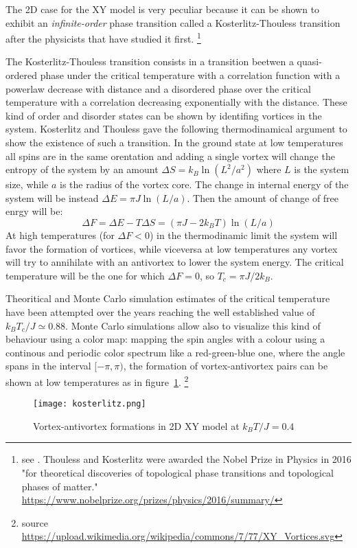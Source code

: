 The 2D case for the XY model is very peculiar because it can be shown to exhibit an
\emph{infinite-order} phase transition called a Kosterlitz-Thouless transition 
after the physicists that have studied it first. \footnote{see 
\cite{Kosterlitz_1973}. Thouless and Kosterlitz were awarded the Nobel Prize in 
Physics in 2016 "for theoretical discoveries of topological phase transitions and 
topological phases of matter." 
\url{https://www.nobelprize.org/prizes/physics/2016/summary/}}

The Kosterlitz-Thouless transition consists in a transition beetwen a quasi-ordered 
phase under the critical temperature with a correlation function with a powerlaw
decrease with distance and a disordered phase over the critical temperature with 
a correlation decreasing exponentially with the distance. These kind of order and
disorder states can be shown by identifing vortices in the system. Kosterlitz and 
Thouless gave the following thermodinamical argument to show the existence of such
a transition. In the ground state at low temperatures all spins are in the same 
orentation and adding a single vortex will change the entropy of the system by
an amount $\Delta S = k_B \ln(L^2 / a^2)$ where $L$ is the system size, while $a$ 
is the radius of the vortex core. The change in internal energy of the system will
be instead $\Delta E = \pi J \ln(L/a)$. Then the amount of change of free enrgy will be:
$$ \Delta F = \Delta E - T \Delta S = (\pi J - 2 k_B T) \ln(L/a) $$
At high temperatures (for $\Delta F < 0$) in the thermodinamic limit the system 
will favor the formation of vortices, while viceversa at low temperatures
any vortex will try to annihilate with an antivortex to lower the system energy.
The critical temperature will be the one for which $\Delta F = 0$, so $T_c = \pi
J / 2 k_B$.

Theoritical and Monte Carlo simulation estimates of the critical temperature have
been attempted over the years reaching the well established value of $k_B T_c / J
\simeq 0.88$. Monte Carlo simulations allow also to visualize this kind of 
behaviour using a color map: mapping the spin angles with a colour using a 
continous and periodic color spectrum like a red-green-blue one, where the angle
spans in the interval $[-\pi, \pi)$, the formation of vortex-antivortex pairs can 
be shown at low temperatures as in figure~\ref{fig:kosterlitz}.
\footnote{source 
\url{https://upload.wikimedia.org/wikipedia/commons/7/77/XY_Vortices.svg}}

\begin{figure}[h]
\label{fig:kosterlitz}
\centering
\texttt{[image: kosterlitz.png]}
\caption{Vortex-antivortex formations in 2D XY model at $k_B T / J = 0.4$}
\end{figure}
 

